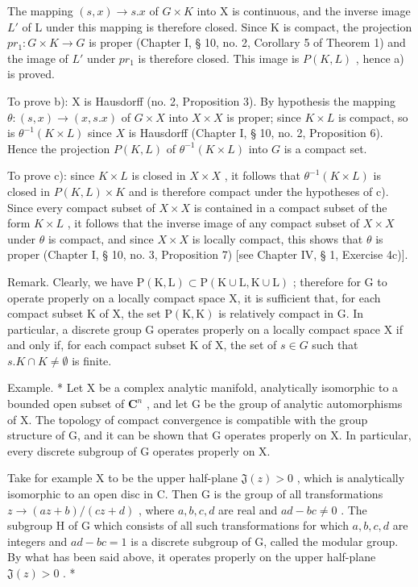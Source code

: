 The mapping \((s, x) \to s.x\) of \(G \times K\) into X is continuous, and the inverse image \(L'\) of L under this mapping is therefore closed. Since K is compact, the projection \(pr_{1}: G \times K \to G\) is proper (Chapter I, § 10, no. 2, Corollary 5 of Theorem 1) and the image of \(L'\) under \(pr_{1}\) is therefore closed. This image is \(P(K, L)\) , hence a) is proved.

To prove b): X is Hausdorff (no. 2, Proposition 3). By hypothesis the mapping \(\theta: (s, x) \to (x, s.x)\) of \(G \times X\) into \(X \times X\) is proper; since \(K \times L\) is compact, so is \(\theta^{-1}(K \times L)\) since \(X\) is Hausdorff (Chapter I, § 10, no. 2, Proposition 6). Hence the projection \(P(K, L)\) of \(\theta^{-1}(K \times L)\) into \(G\) is a compact set.

To prove c): since \(K \times L\) is closed in \(X \times X\) , it follows that \(\theta^{-1}(K \times L)\) is closed in \(P(K, L) \times K\) and is therefore compact under the hypotheses of c). Since every compact subset of \(X \times X\) is contained in a compact subset of the form \(K \times L\) , it follows that the inverse image of any compact subset of \(X \times X\) under \(\theta\) is compact, and since \(X \times X\) is locally compact, this shows that \(\theta\) is proper (Chapter I, § 10, no. 3, Proposition 7) {[}see Chapter IV, § 1, Exercise 4c){]}.

Remark. Clearly, we have \(\mathrm{P}(\mathrm{K},\mathrm{L})\subset\mathrm{P}(\mathrm{K}\cup\mathrm{L},\mathrm{K}\cup\mathrm{L})\) ; therefore for G to operate properly on a locally compact space X, it is sufficient that, for each compact subset K of X, the set \(\mathrm{P}(\mathrm{K},\mathrm{K})\) is relatively compact in G. In particular, a discrete group G operates properly on a locally compact space X if and only if, for each compact subset K of X, the set of \(s\in G\) such that \(s.K\cap K\neq\emptyset\) is finite.

Example. * Let X be a complex analytic manifold, analytically isomorphic to a bounded open subset of \(\mathbf{C}^n\) , and let G be the group of analytic automorphisms of X. The topology of compact convergence is compatible with the group structure of G, and it can be shown that G operates properly on X. In particular, every discrete subgroup of G operates properly on X.

Take for example X to be the upper half-plane \(\mathfrak{J}(z)>0\) , which is analytically isomorphic to an open disc in C. Then G is the group of all transformations \(z\to (az+b)/(cz+d)\) , where \(a,b,c,d\) are real and \(ad-bc\neq0\) . The subgroup H of G which consists of all such transformations for which \(a,b,c,d\) are integers and \(ad-bc=1\) is a discrete subgroup of G, called the modular group. By what has been said above, it operates properly on the upper half-plane \(\mathfrak{J}(z)>0\) . *


